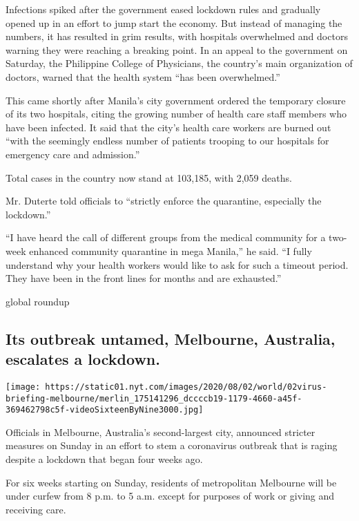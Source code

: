 Infections spiked after the government eased lockdown rules and
gradually opened up in an effort to jump start the economy. But instead
of managing the numbers, it has resulted in grim results, with hospitals
overwhelmed and doctors warning they were reaching a breaking point. In
an appeal to the government on Saturday, the Philippine College of
Physicians, the country's main organization of doctors, warned that the
health system ``has been overwhelmed.''

This came shortly after Manila's city government ordered the temporary
closure of its two hospitals, citing the growing number of health care
staff members who have been infected. It said that the city's health
care workers are burned out ``with the seemingly endless number of
patients trooping to our hospitals for emergency care and admission.''

Total cases in the country now stand at 103,185, with 2,059 deaths.

Mr. Duterte told officials to ``strictly enforce the quarantine,
especially the lockdown.''

``I have heard the call of different groups from the medical community
for a two-week enhanced community quarantine in mega Manila,'' he said.
``I fully understand why your health workers would like to ask for such
a timeout period. They have been in the front lines for months and are
exhausted.''

global roundup

\hypertarget{its-outbreak-untamed-melbourne-australia-escalates-a-lockdown}{%
\subsection{Its outbreak untamed, Melbourne, Australia, escalates a
lockdown.}\label{its-outbreak-untamed-melbourne-australia-escalates-a-lockdown}}

\texttt{[image: https://static01.nyt.com/images/2020/08/02/world/02virus-briefing-melbourne/merlin\_175141296\_dccccb19-1179-4660-a45f-369462798c5f-videoSixteenByNine3000.jpg]}

Officials in Melbourne, Australia's second-largest city, announced
stricter measures on Sunday in an effort to stem a coronavirus outbreak
that is raging despite a lockdown that began four weeks ago.

For six weeks starting on Sunday, residents of metropolitan Melbourne
will be under curfew from 8 p.m. to 5 a.m. except for purposes of work
or giving and receiving care.

